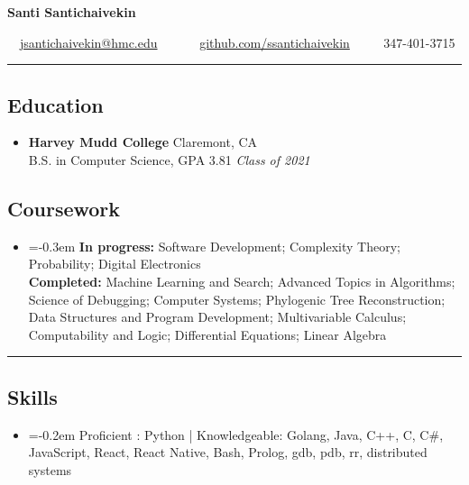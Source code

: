 \documentclass[10pt,letterpaper]{article}
\begin{document}
\begin{center}
{\Large \textbf{Santi Santichaivekin}}

\ \ \href{mailto:jsantichaivekin@hmc.edu}{jsantichaivekin@hmc.edu}\ \ 
\ \ \textbullet
\ \ \href{https://github.com/ssantichaivekin}{github.com/ssantichaivekin}
\ \ \textbullet
\ \ 347-401-3715

\end{center}


\hrule
\vspace{-0.95em}
\subsection*{Education}
  \begin{itemize}
    \parskip=-0.5em

    \item[]
    \textbf{Harvey Mudd College} \hfill
      Claremont, CA\\
    {B.S. in Computer Science, GPA 3.81
    \hfill \emph{Class of 2021}}
  \end{itemize}
  \vspace{-2.07em}
\subsection*{Coursework}
\begin{itemize}
\item[]
    \parskip=-0.3em
  \textbf{In progress:}  Software Development; Complexity Theory; Probability; Digital Electronics \\
  \textbf{Completed:} Machine Learning and Search; Advanced Topics in Algorithms; 
  Science of Debugging;
  Computer Systems;
  Phylogenic Tree Reconstruction;
  Data Structures and Program Development; 
  Multivariable Calculus;
  Computability and Logic; 
  Differential Equations;
  Linear Algebra
  

\end{itemize}

\hrule
\vspace{-0.95em}
\subsection*{Skills}
\begin{itemize}
\item[]
    \parskip=-0.2em
  Proficient : Python | Knowledgeable: Golang, Java, C++, C, C\#, JavaScript, React, React Native, Bash, Prolog, gdb, pdb, rr,
  distributed systems
    
\end{itemize}
\end{document}

